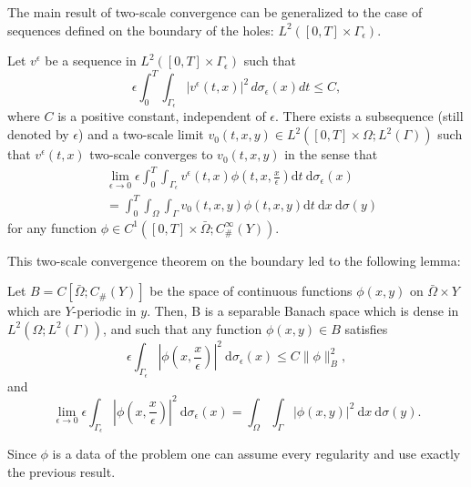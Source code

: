 The main result of two-scale convergence can be generalized to the case of sequences defined on the boundary of the holes: $L^{2}\left([0, T] \times \Gamma_{\epsilon}\right)$.
\begin{theorem}
Let $v^{\epsilon}$ be a sequence in $L^{2}\left([0, T] \times \Gamma_{\epsilon}\right)$ such that
$$
\epsilon \int_{0}^{T} \int_{\Gamma_{\epsilon}}\left|v^{\epsilon}(t, x)\right|^{2} \, d\sigma_{\epsilon}(x)dt \leq C,
$$
where $C$ is a positive constant, independent of $\epsilon$. There exists a subsequence (still denoted by $\epsilon$) and a two-scale limit $v_{0}(t, x, y) \in L^{2}\left([0, T] \times \Omega ; L^{2}(\Gamma)\right)$ such that $v^{\epsilon}(t, x)$ two-scale converges to $v_{0}(t, x, y)$ in the sense that
$$
\begin{aligned}
&\lim _{\epsilon \rightarrow 0} \epsilon \int_{0}^{T} \int_{\Gamma_{\epsilon}} v^{\epsilon}(t, x) \phi\left(t, x, \frac{x}{\epsilon}\right) \mathrm{d} t \mathrm{~d} \sigma_{\epsilon}(x) \\
&=\int_{0}^{T} \int_{\Omega} \int_{\Gamma} v_{0}(t, x, y) \phi(t, x, y) \mathrm{d} t \mathrm{~d} x \mathrm{~d} \sigma(y)
\end{aligned}
$$
for any function $\phi \in C^{1}\left([0, T] \times \bar{\Omega} ; C_{\#}^{\infty}(Y)\right)$.
\label{thm 7.5}\end{theorem}
This two-scale convergence theorem on the boundary led to the following lemma:
\begin{lemma} Let $B=C\left[\bar{\Omega} ; C_{\#}(Y)\right]$ be the space of continuous functions $\phi(x, y)$ on $\bar{\Omega} \times Y$ which are $Y$-periodic in $y$. Then, B is a separable Banach space which is dense in $L^{2}\left(\Omega ; L^{2}(\Gamma)\right)$, and such that any function $\phi(x, y) \in B$ satisfies
$$
\epsilon \int_{\Gamma_{\epsilon}}\left|\phi\left(x, \frac{x}{\epsilon}\right)\right|^{2} \mathrm{~d} \sigma_{\epsilon}(x) \leq C\|\phi\|_{B}^{2},
$$
and
$$
\lim _{\epsilon \rightarrow 0} \epsilon \int_{\Gamma_{\epsilon}}\left|\phi\left(x, \frac{x}{\epsilon}\right)\right|^{2} \mathrm{~d} \sigma_{\epsilon}(x)=\int_{\Omega} \int_{\Gamma}|\phi(x, y)|^{2} \mathrm{~d} x \mathrm{~d} \sigma(y) .
$$
\label{lemma 7.4}\end{lemma}
Since $\phi$ is a data of the problem one can assume every regularity and use exactly the previous result.
